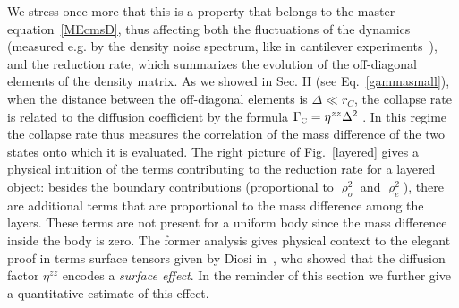\documentclass[11pt,onecolumn,amssymb,nofootinbib]{revtex4}
\begin{document}
We stress once more that this is a property that belongs to the master equation~\eqref{MEcmsD}, thus affecting both the fluctuations of the dynamics (measured e.g. by the density noise spectrum, like in cantilever experiments~\cite{lay-exp}), and %
the reduction rate, which summarizes the evolution of the off-diagonal elements of the density matrix. As we showed in Sec. II (see Eq.~\eqref{gammasmall}), when the distance between the off-diagonal elements is $\Delta\ll r_C$, the collapse rate is related to the diffusion coefficient by the formula $\Gamma_\text{\tiny{C}}=\eta^{zz}\Delta^2$ . 
In this regime the collapse rate thus measures the correlation of the mass difference of the two states onto which it is evaluated. The right picture of Fig.~\ref{layered} gives a physical intuition of the terms contributing to the reduction rate for a layered object: besides the boundary contributions (proportional to $\varrho_o^2$ and $\varrho_e^2$), there are additional terms that are proportional to the mass difference among the layers. These terms are not present for a uniform body since the mass difference inside the body is zero.  The former analysis gives physical context to the elegant proof in terms surface tensors given by Diosi in~\cite{Dio19}, who showed that the diffusion factor $\eta^{zz}$ encodes a \emph{surface effect}. In the reminder of this section we further give a quantitative estimate of this effect.
\end{document}
